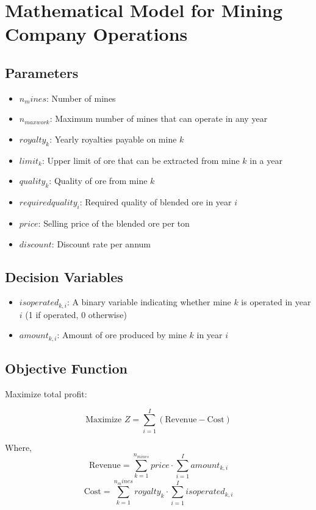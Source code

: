 \documentclass{article}
\begin{document}
\section*{Mathematical Model for Mining Company Operations}

\subsection*{Parameters}
\begin{itemize}
    \item $n_mines$: Number of mines
    \item $n_{maxwork}$: Maximum number of mines that can operate in any year
    \item $royalty_k$: Yearly royalties payable on mine $k$
    \item $limit_k$: Upper limit of ore that can be extracted from mine $k$ in a year
    \item $quality_k$: Quality of ore from mine $k$
    \item $requiredquality_i$: Required quality of blended ore in year $i$
    \item $price$: Selling price of the blended ore per ton
    \item $discount$: Discount rate per annum
\end{itemize}

\subsection*{Decision Variables}
\begin{itemize}
    \item $isoperated_{k,i}$: A binary variable indicating whether mine $k$ is operated in year $i$ (1 if operated, 0 otherwise)
    \item $amount_{k,i}$: Amount of ore produced by mine $k$ in year $i$
\end{itemize}

\subsection*{Objective Function}
Maximize total profit:

\[
\text{Maximize } Z = \sum_{i=1}^{I} \left( \text{Revenue} - \text{Cost} \right)
\]

Where,
\[
\text{Revenue} = \sum_{k=1}^{n_{mines}} price \cdot \sum_{i=1}^{I} amount_{k,i}
\]
\[
\text{Cost} = \sum_{k=1}^{n_mines} royalty_k \cdot \sum_{i=1}^{I} isoperated_{k,i}
\]
\end{document}
